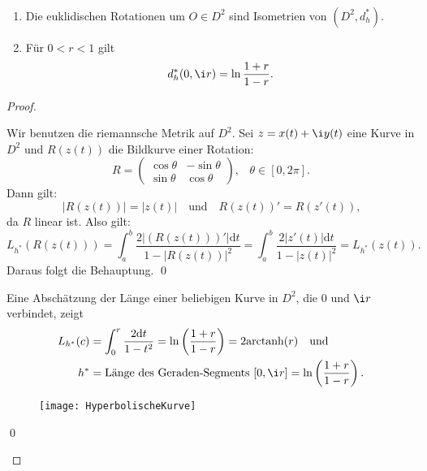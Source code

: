\begin{theorem}
  \
  \begin{enumerate}
    \item Die euklidischen Rotationen um \( O \in D^2 \) sind Isometrien von \( (D^2, d_h^\ast) \).
    \item Für \( 0 < r < 1 \) gilt
    \begin{equation*}
      d_h^\ast(0,\i r) = \ln\frac{1+r}{1-r}\text{.}
    \end{equation*}
  \end{enumerate}
  \begin{proof}
    \
    \begin{enumerate}
      \item Wir benutzen die riemannsche Metrik auf \( D^2 \). Sei \( z = x(t) + \i y(t) \) eine Kurve in \( D^2 \) und \( R(z(t)) \) die Bildkurve einer Rotation:
      \begin{equation*}
        R = \begin{pmatrix}
          \cos \theta & - \sin \theta \\
          \sin \theta & \cos \theta
        \end{pmatrix}\text{,}\quad \theta \in [0,2\pi]\text{.}
      \end{equation*}
      Dann gilt:
      \begin{equation*}
        \left\vert R(z(t)) \right\vert = \left\vert z(t) \right\vert \quad \text{und} \quad R(z(t))' = R(z'(t))\text{,}
      \end{equation*}
      da \( R \) linear ist. Also gilt:
      \begin{equation*}
        L_{h^\ast}(R(z(t))) = \int_a^b \frac{2\left\vert (R(z(t)))' \right\vert\text{d}t}{1-\left\vert R(z(t)) \right\vert^2} = \int_a^b \frac{2\left\vert z'(t) \right\vert\text{d}t}{1-\left\vert z(t) \right\vert^2} = L_{h^\ast}(z(t))\text{.}
      \end{equation*}
      Daraus folgt die Behauptung. \qed{}

      \begin{minipage}{.65\textwidth}
        \item Eine Abschätzung der Länge einer beliebigen Kurve in \( D^2 \), die \( 0 \) und \( \i r \) verbindet, zeigt
        \begin{align*}
          L_{h^\ast}(c) &= \int_0^r \frac{2\text{d}t}{1-t^2} = \ln\left( \frac{1+r}{1-r} \right) = 2\text{arctanh}(r) \quad \text{und} \\
          h^\ast &= \text{Länge des Geraden-Segments } [0,\i r] = \ln\left( \frac{1+r}{1-r} \right)\text{.}
        \end{align*}
      \end{minipage}
      \hfill
      \begin{minipage}{.325\textwidth}
        \begin{figure}[H]
          \texttt{[image: HyperbolischeKurve]}
        \end{figure}
      \end{minipage}
      \qed{}
    \end{enumerate}
  \end{proof}
\end{theorem}

